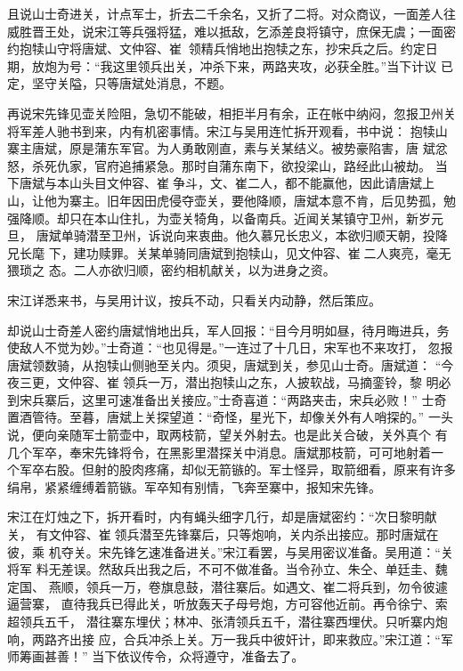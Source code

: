 且说山士奇进关，计点军士，折去二千余名，又折了二将。对众商议，一面差人往
威胜晋王处，说宋江等兵强将猛，难以抵敌，乞添差良将镇守，庶保无虞；一面密
约抱犊山守将唐斌、文仲容、崔，领精兵悄地出抱犊之东，抄宋兵之后。约定日
期，放炮为号：“我这里领兵出关，冲杀下来，两路夹攻，必获全胜。”当下计议
已定，坚守关隘，只等唐斌处消息，不题。

再说宋先锋见壶关险阻，急切不能破，相拒半月有余，正在帐中纳闷，忽报卫州关
将军差人驰书到来，内有机密事情。宋江与吴用连忙拆开观看，书中说：
抱犊山寨主唐斌，原是蒲东军官。为人勇敢刚直，素与关某结义。被势豪陷害，唐
斌忿怒，杀死仇家，官府追捕紧急。那时自蒲东南下，欲投梁山，路经此山被劫。
当下唐斌与本山头目文仲容、崔争斗，文、崔二人，都不能赢他，因此请唐斌上
山，让他为寨主。旧年因田虎侵夺壶关，要他降顺，唐斌本意不肯，后见势孤，勉
强降顺。却只在本山住扎，为壶关犄角，以备南兵。近闻关某镇守卫州，新岁元旦，
唐斌单骑潜至卫州，诉说向来衷曲。他久慕兄长忠义，本欲归顺天朝，投降兄长麾
下，建功赎罪。关某单骑同唐斌到抱犊山，见文仲容、崔二人爽亮，毫无猥琐之
态。二人亦欲归顺，密约相机献关，以为进身之资。

宋江详悉来书，与吴用计议，按兵不动，只看关内动静，然后策应。

却说山士奇差人密约唐斌悄地出兵，军人回报：“目今月明如昼，待月晦进兵，务
使敌人不觉为妙。”士奇道：“也见得是。”一连过了十几日，宋军也不来攻打，
忽报唐斌领数骑，从抱犊山侧驰至关内。须臾，唐斌到关，参见山士奇。唐斌道：
“今夜三更，文仲容、崔领兵一万，潜出抱犊山之东，人披软战，马摘銮铃，黎
明必到宋兵寨后，这里可速准备出关接应。”士奇喜道：“两路夹击，宋兵必败！”
士奇置酒管待。至暮，唐斌上关探望道：“奇怪，星光下，却像关外有人哨探的。”
一头说，便向亲随军士箭壶中，取两枝箭，望关外射去。也是此关合破，关外真个
有几个军卒，奉宋先锋将令，在黑影里潜探关中消息。唐斌那枝箭，可可地射着一
个军卒右股。但射的股肉疼痛，却似无箭镞的。军士怪异，取箭细看，原来有许多
绢帛，紧紧缠缚着箭镞。军卒知有别情，飞奔至寨中，报知宋先锋。

宋江在灯烛之下，拆开看时，内有蝇头细字几行，却是唐斌密约：“次日黎明献关，
有文仲容、崔领兵潜至先锋寨后，只等炮响，关内杀出接应。那时唐斌在彼，乘
机夺关。宋先锋乞速准备进关。”宋江看罢，与吴用密议准备。吴用道：“关将军
料无差误。然敌兵出我之后，不可不做准备。当令孙立、朱仝、单廷圭、魏定国、
燕顺，领兵一万，卷旗息鼓，潜往寨后。如遇文、崔二将兵到，勿令彼遽逼营寨，
直待我兵已得此关，听放轰天子母号炮，方可容他近前。再令徐宁、索超领兵五千，
潜往寨东埋伏；林冲、张清领兵五千，潜往寨西埋伏。只听寨内炮响，两路齐出接
应，合兵冲杀上关。万一我兵中彼奸计，即来救应。”宋江道：“军师筹画甚善！”
当下依议传令，众将遵守，准备去了。

